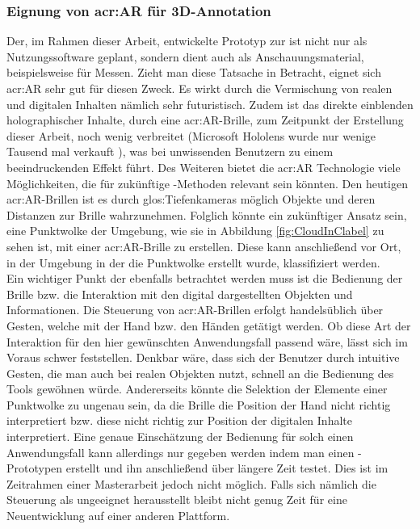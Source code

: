 \subsubsection{Eignung von \acrlong{acr:AR} für 3D-Annotation}
Der, im Rahmen dieser Arbeit, entwickelte Prototyp zur  ist nicht nur als Nutzungssoftware geplant, sondern dient auch als Anschauungsmaterial, beispielsweise für Messen. Zieht man diese Tatsache in Betracht, eignet sich \acrlong{acr:AR} sehr gut für diesen Zweck. Es wirkt durch die Vermischung von realen und digitalen Inhalten nämlich sehr futuristisch. Zudem ist das direkte einblenden holographischer Inhalte, durch eine \acrshort{acr:AR}-Brille, zum Zeitpunkt der Erstellung dieser Arbeit, noch wenig verbreitet (Microsoft Hololens wurde nur wenige Tausend mal verkauft \cite{bib:HololensVerkaufszahlen}), was bei unwissenden Benutzern zu einem beeindruckenden Effekt führt. Des Weiteren bietet die \acrlong{acr:AR} Technologie viele Möglichkeiten, die für zukünftige -Methoden relevant sein könnten. Den heutigen \acrshort{acr:AR}-Brillen ist es durch \glspl{glos:Tiefenkamera} möglich Objekte und deren Distanzen zur Brille wahrzunehmen. Folglich könnte ein zukünftiger Ansatz sein, eine Punktwolke der Umgebung, wie sie in Abbildung \ref{fig:CloudInClabel} zu sehen ist, mit einer \acrshort{acr:AR}-Brille zu erstellen. Diese kann anschließend vor Ort, in der Umgebung in der die Punktwolke erstellt wurde, klassifiziert werden.\\ %

Ein wichtiger Punkt der ebenfalls betrachtet werden muss ist die Bedienung der Brille bzw. die Interaktion mit den digital dargestellten Objekten und Informationen. Die Steuerung von \acrshort{acr:AR}-Brillen erfolgt handelsüblich über Gesten, welche mit der Hand bzw. den Händen getätigt werden. Ob diese Art der Interaktion für den hier gewünschten Anwendungsfall passend wäre, lässt sich im Voraus schwer feststellen. Denkbar wäre, dass sich der Benutzer durch intuitive Gesten, die man auch bei realen Objekten nutzt, schnell an die Bedienung des Tools gewöhnen würde. Andererseits könnte die Selektion der Elemente einer Punktwolke zu ungenau sein, da die Brille die Position der Hand nicht richtig interpretiert bzw. diese nicht richtig zur Position der digitalen Inhalte interpretiert. Eine genaue Einschätzung der Bedienung für solch einen Anwendungsfall kann allerdings nur gegeben werden indem man einen -Prototypen erstellt und ihn anschließend über längere Zeit testet. Dies ist im Zeitrahmen einer Masterarbeit jedoch nicht möglich. Falls sich nämlich die Steuerung als ungeeignet herausstellt bleibt nicht genug Zeit für eine Neuentwicklung auf einer anderen Plattform.\\  


